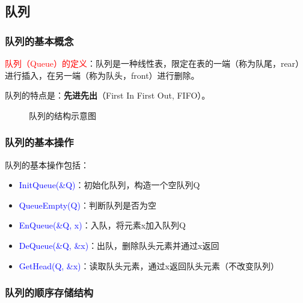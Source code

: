 \documentclass{../../note}
\begin{document}
\subsection{队列}

\subsubsection{队列的基本概念}

\textcolor{red}{队列（Queue）的定义}：队列是一种线性表，限定在表的一端（称为队尾，rear）进行插入，在另一端（称为队头，front）进行删除。

队列的特点是：\textbf{先进先出}（First In First Out, FIFO）。

\begin{figure}[h]
  \centering
  \caption{队列的结构示意图}
\end{figure}

\subsubsection{队列的基本操作}

队列的基本操作包括：

\begin{itemize}
  \item \textcolor{blue}{InitQueue(\&Q)}：初始化队列，构造一个空队列Q
  \item \textcolor{blue}{QueueEmpty(Q)}：判断队列是否为空
  \item \textcolor{blue}{EnQueue(\&Q, x)}：入队，将元素x加入队列Q
  \item \textcolor{blue}{DeQueue(\&Q, \&x)}：出队，删除队头元素并通过x返回
  \item \textcolor{blue}{GetHead(Q, \&x)}：读取队头元素，通过x返回队头元素（不改变队列）
\end{itemize}

\subsubsection{队列的顺序存储结构}
\end{document}
